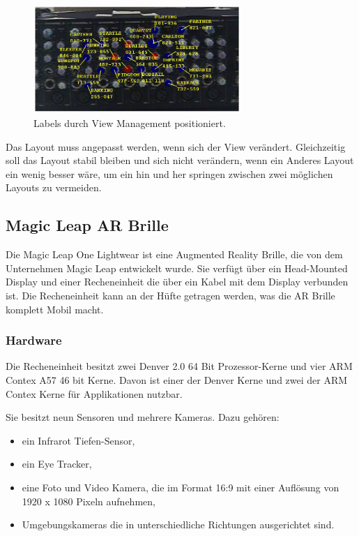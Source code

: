 \begin{figure}[H]
	\centering
	\includegraphics[width=0.7\textwidth]{images/ViewManagementImageFromPaper.PNG}
	\caption[]{Labels durch View Management positioniert.\citep{viewmanagement}}
	\label{viewManagement}
\end{figure}
Das Layout muss angepasst werden, wenn sich der View verändert. Gleichzeitig soll das Layout stabil bleiben und sich nicht verändern, wenn ein Anderes Layout ein wenig besser wäre, um ein hin und her springen zwischen zwei möglichen Layouts zu vermeiden.\citep{viewmanagement}

\subsection{Magic Leap AR Brille}

Die Magic Leap One Lightwear ist eine Augmented Reality Brille, die von dem Unternehmen Magic Leap entwickelt wurde. Sie verfügt über ein Head-Mounted Display und einer Recheneinheit die über ein Kabel mit dem Display verbunden ist. Die Recheneinheit kann an der Hüfte getragen werden, was die AR Brille komplett Mobil macht. 


\subsubsection{Hardware}

Die Recheneinheit besitzt zwei Denver 2.0 64 Bit Prozessor-Kerne und vier ARM Contex A57 46 bit Kerne. Davon ist einer der Denver Kerne und zwei der ARM Contex Kerne für Applikationen nutzbar.  

Sie besitzt neun Sensoren und mehrere Kameras. Dazu gehören:
\begin{itemize}
	\item ein Infrarot Tiefen-Sensor,
	\item ein Eye Tracker,
	\item eine Foto und Video Kamera, die im Format 16:9 mit einer Auflösung von 1920 x 1080 Pixeln aufnehmen,
	\item Umgebungskameras die in unterschiedliche Richtungen ausgerichtet sind. \citep{mlofficialsalespitch,mlglossary}
\end{itemize}

